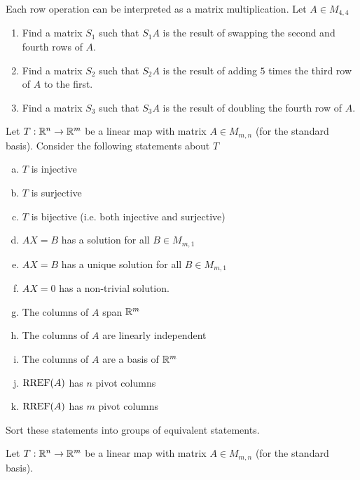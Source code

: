 
\begin{applicationActivities}{2}{23}

\begin{activity}{0}
Each row operation can be interpreted as a matrix multiplication.  Let $A \in M_{4,4}$
\begin{enumerate}[1)]
\item Find a matrix $S_1$ such that $S_1A$ is the result of swapping the second and fourth rows of $A$.
\item Find a matrix $S_2$ such that $S_2A$ is the result of adding $5$ times the third row of $A$ to the first.
\item Find a matrix $S_3$ such that $S_3A$ is the result of doubling the fourth row of $A$.
\end{enumerate}
\end{activity}


\begin{activity}{0}
Let $T: \mathbb{R}^n \rightarrow \mathbb{R}^m$ be a linear map with matrix $A \in M_{m,n}$ (for the standard basis).  Consider the following statements about $T$
\begin{enumerate}[(a)]
\item $T$ is injective
\item $T$ is surjective
\item $T$ is bijective (i.e. both injective and surjective)
\item $AX=B$ has a solution for all $B \in M_{m,1}$
\item $AX=B$ has a unique solution for all $B \in M_{m,1}$
\item $AX=0$ has a non-trivial solution.
\item The columns of $A$ span $\mathbb{R}^m$
\item The columns of $A$ are linearly independent
\item The columns of $A$ are a basis of $\mathbb{R}^m$
\item $\operatorname{RREF}(A)$ has $n$ pivot columns
\item $\operatorname{RREF}(A)$ has $m$ pivot columns
\end{enumerate}

Sort these statements into groups of equivalent statements.

\end{activity}

\begin{activity}{0}
Let $T: \mathbb{R}^n \rightarrow \mathbb{R}^m$ be a linear map with matrix $A \in M_{m,n}$ (for the standard basis).


\end{activity}
\end{applicationActivities}
